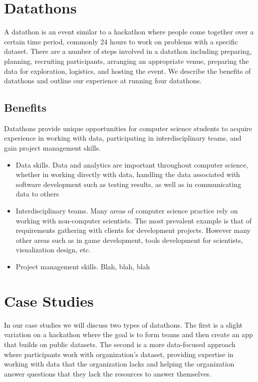 \section{Datathons}

A datathon is an event similar to a hackathon where people come together over a certain time period, commonly 24 hours to work on problems with a specific dataset. There are a number of steps involved in a datathon including preparing, planning, recruiting participants, arranging an appropriate venue, preparing the data for exploration, logistics, and hosting the event. We describe the benefits of datathons and outline our experience at running four datathons.

\subsection{Benefits}

Datathons provide unique opportunities for computer science students to acquire experience in working with data, participating in interdisciplinary teams, and gain project management skills.
\begin{itemize}
\item Data skills.  Data and analytics are important throughout computer science, whether in working directly with data, handling the data associated with software development such as testing results, as well as in communicating data to others
\item Interdisciplinary teams.  Many areas of computer science practice rely on working with non-computer scientists.  The most prevalent example is that of requirements gathering with clients for development projects.   However many other areas such as in game development, tools development for scientists, visualization design, etc.
\item	Project management skills. Blah, blah, blah
\end{itemize}


\section{Case Studies}

In our case studies we will discuss two types of datathons.  The first is a slight variation on a hackathon where the goal is to form teams and then create an app that builds on public datasets.  The second is a more data-focused approach where participants work with organization’s dataset, providing expertise in working with data that the organization lacks and helping the organization answer questions that they lack the resources to answer themselves.

